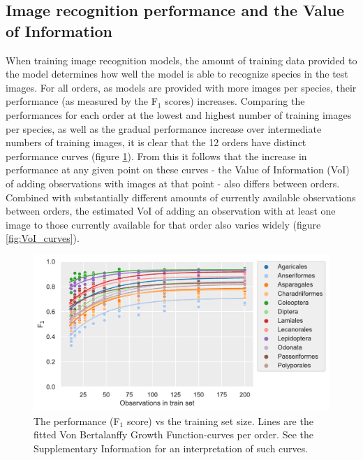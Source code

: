 \documentclass{article}
\begin{document}
\subsection*{Image recognition performance and the Value of Information}
When training image recognition models, the amount of training data provided to the model determines how well the model is able to recognize species in the test images. For all orders, as models are provided with more images per species, their performance (as measured by the F\(_1\) scores) increases. Comparing the performances for each order at the lowest and highest number of training images per species, as well as the gradual performance increase over intermediate numbers of training images, it is clear that the 12 orders have distinct performance curves (figure \ref{fig:F1_curves}). From this it follows that the increase in performance at any given point on these curves - the Value of Information (VoI) of adding observations with images at that point - also differs between orders. Combined with substantially different amounts of currently available observations between orders, the estimated VoI of adding an observation with at least one image to those currently available for that order also varies widely (figure \ref{fig:VoI_curves}).


\begin{figure}[!ht]
  \includegraphics[width=\textwidth]{2}
  \caption{\footnotesize The performance (F\(_1\) score) vs the training set size. Lines are the fitted Von Bertalanffy Growth Function-curves per order. See the Supplementary Information for an interpretation of such curves.
  }
  \label{fig:F1_curves}
\end{figure}
\end{document}
